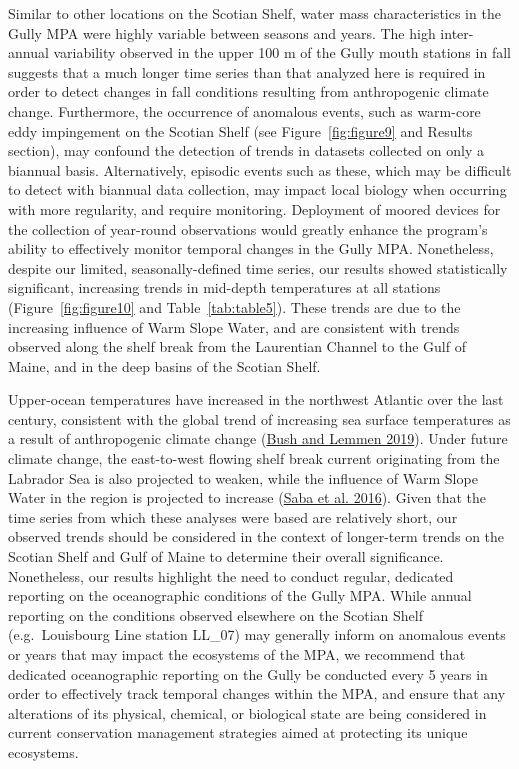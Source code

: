 \documentclass[12pt]{article}\usepackage[]{graphicx}\usepackage[]{color}
\begin{document}
Similar to other locations on the Scotian Shelf, water mass characteristics in the Gully MPA were highly variable between seasons and years. The high inter-annual variability observed in the upper 100 m of the Gully mouth stations in fall suggests that a much longer time series than that analyzed here is required in order to detect changes in fall conditions resulting from anthropogenic climate change. Furthermore, the occurrence of anomalous events, such as warm-core eddy impingement on the Scotian Shelf (see Figure~\ref{fig:figure9} and Results section), may confound the detection of trends in datasets collected on only a biannual basis. Alternatively, episodic events such as these, which may be difficult to detect with biannual data collection, may impact local biology when occurring with more regularity, and require monitoring. Deployment of moored devices for the collection of year-round observations would greatly enhance the program's ability to effectively monitor temporal changes in the Gully MPA. Nonetheless, despite our limited, seasonally-defined time series, our results showed statistically significant, increasing trends in mid-depth temperatures at all stations (Figure~\ref{fig:figure10} and Table~\ref{tab:table5}). These trends are due to the increasing influence of Warm Slope Water, and are consistent with trends observed along the shelf break from the Laurentian Channel to the Gulf of Maine, and in the deep basins of the Scotian Shelf.

Upper-ocean temperatures have increased in the northwest Atlantic over the last century, consistent with the global trend of increasing sea surface temperatures as a result of anthropogenic climate change (\protect\hyperlink{ref-bush_2019}{Bush and Lemmen 2019}). Under future climate change, the east-to-west flowing shelf break current originating from the Labrador Sea is also projected to weaken, while the influence of Warm Slope Water in the region is projected to increase (\protect\hyperlink{ref-saba_2016}{Saba et al. 2016}). Given that the time series from which these analyses were based are relatively short, our observed trends should be considered in the context of longer-term trends on the Scotian Shelf and Gulf of Maine to determine their overall significance. Nonetheless, our results highlight the need to conduct regular, dedicated reporting on the oceanographic conditions of the Gully MPA. While annual reporting on the conditions observed elsewhere on the Scotian Shelf (e.g.~Louisbourg Line station LL\_07) may generally inform on anomalous events or years that may impact the ecosystems of the MPA, we recommend that dedicated oceanographic reporting on the Gully be conducted every 5 years in order to effectively track temporal changes within the MPA, and ensure that any alterations of its physical, chemical, or biological state are being considered in current conservation management strategies aimed at protecting its unique ecosystems.
\end{document}
